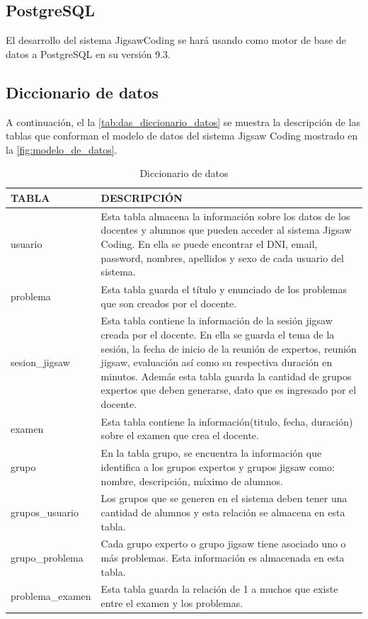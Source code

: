 \subsection{PostgreSQL}
El desarrollo del sistema JigsawCoding se hará usando como motor de base de datos a PostgreSQL en su versión 9.3. 
\subsection{Diccionario de datos}
A continuación, el la \autoref{tab:das_diccionario_datos} se muestra la descripción de las tablas que conforman el modelo de datos del sistema Jigsaw Coding mostrado en la \autoref{fig:modelo_de_datos}.
\begin{longtable}{|L{4cm}|L{9cm}|}
	\caption{Diccionario de datos}
	\label{tab:das_diccionario_datos}\\
	\toprule[0.7mm]
	TABLA & DESCRIPCIÓN \\
	\midrule
	usuario & Esta tabla almacena la información sobre los datos de los docentes y alumnos que pueden acceder al sistema Jigsaw Coding. En ella se puede encontrar el DNI, email, password, nombres, apellidos y sexo de cada usuario del sistema.\\
	\midrule
	problema & Esta tabla guarda el título y enunciado de los problemas que son creados por el docente. \\
	\midrule
	sesion\_jigsaw & Esta tabla contiene la información de la sesión jigsaw creada por el docente. En ella se guarda el tema de la sesión, la fecha de inicio de la reunión de expertos, reunión jigsaw, evaluación así como su respectiva duración en minutos. Además esta tabla guarda la cantidad de grupos expertos que deben generarse, dato que es ingresado por el docente.\\
	\midrule
	examen & Esta tabla contiene la información(titulo, fecha, duración) sobre el examen que crea el docente.\\
	\midrule
	grupo & En la tabla grupo, se encuentra la información que identifica a los grupos expertos y grupos jigsaw como: nombre, descripción, máximo de alumnos.\\
	\midrule
	grupos\_usuario & Los grupos que se generen en el sistema deben tener una cantidad de alumnos y esta relación se almacena en esta tabla.\\
	\midrule
	grupo\_problema & Cada grupo experto o grupo jigsaw tiene asociado uno o más problemas. Esta información es almacenada en esta tabla.\\
	\midrule
	problema\_examen & Esta tabla guarda la relación de 1 a muchos que existe entre el examen y los problemas.\\

\end{longtable}
